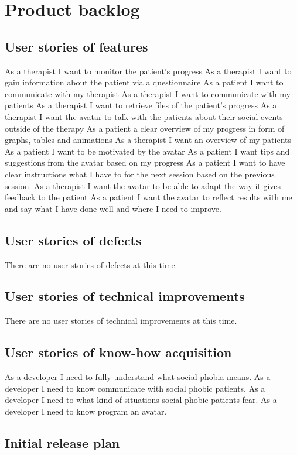 \chapter{Product backlog}

\section{User stories of features}
As a therapist I want to monitor the patient’s progress
As a therapist I want to gain information about the patient via a questionnaire
As a patient I want to communicate with my therapist
As a therapist I want to communicate with my patients
As a therapist I want to retrieve files of the patient’s progress
As a therapist I want the avatar to talk with the patients about their social events outside of the therapy
As a patient a clear overview of my progress in form of graphs, tables and animations
As a therapist I want an overview of my patients 
As a patient I want to be motivated by the avatar
As a patient I want tips and suggestions from the avatar based on my progress
As a patient I want to have clear instructions what I have to for the next session based on the previous session.
As a therapist I want the avatar to be able to adapt the way it gives feedback to the patient
As a patient I want the avatar to reflect results with me and say what I have done well and where I need to improve.

\section{User stories of defects}
There are no user stories of defects at this time.

\section{User stories of technical improvements}
There are no user stories of technical improvements at this time.

\section{User stories of know-how acquisition}
As a developer I need to fully understand what social phobia means.
As a developer I need to know communicate with social phobic patients.
As a developer I need to what kind of situations social phobic patients fear.
As a developer I need to know program an avatar.
\section{Initial release plan}